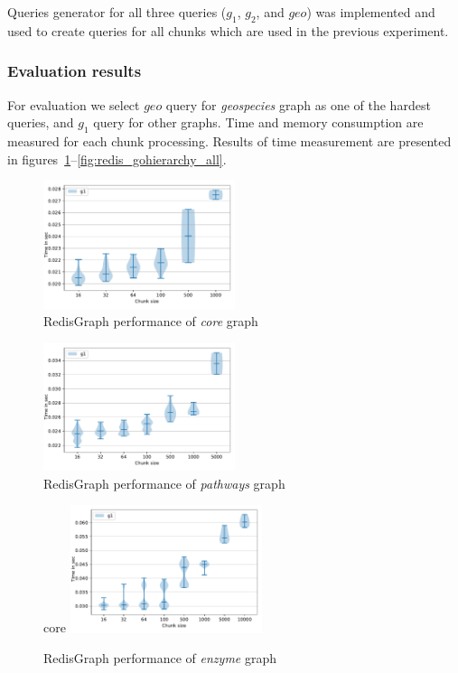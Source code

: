 Queries generator for all three queries ($g_1$, $g_2$, and $geo$) was implemented and used to create queries for all chunks which are used in the previous experiment. 


\subsubsection{Evaluation results}

For evaluation we select $geo$ query for \textit{geospecies} graph as one of the hardest queries, and $g_1$ query for other graphs.
Time and memory consumption are measured for each chunk processing.
Results of time measurement are presented in figures~\ref{fig:redis_core_all}--\ref{fig:redis_gohierarchy_all}.

\begin{figure}[h]
\centering
\includegraphics[width=0.5\textwidth]{data/raw_redis/core.pdf}
\caption{RedisGraph performance of \textit{core} graph}
\label{fig:redis_core_all}
\end{figure}


\begin{figure}[h]
\centering
\includegraphics[width=0.5\textwidth]{data/raw_redis/pathways.pdf}
\caption{RedisGraph performance of \textit{pathways} graph}
\label{fig:redis_pathways_all}
\end{figure}

\begin{figure}[h]core
\centering
\includegraphics[width=0.5\textwidth]{data/raw_redis/enzyme.pdf}
\caption{RedisGraph performance of \textit{enzyme} graph}
\label{fig:redis_enzyme_all}
\end{figure}


